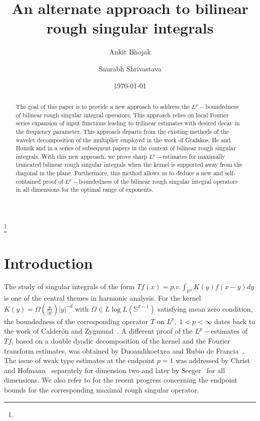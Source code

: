 \documentclass[a4paper,reqno]{amsart}
\date{\today}
\newcommand{\R}{{\mathbb R}}       %
\newcommand{\Sp}{{\mathbb S}}
\theoremstyle{definition}
\numberwithin{equation}{section}
\begin{document}
	
\title{An alternate approach to bilinear rough singular integrals}
\author[Bhojak]{Ankit Bhojak}
	\address{Ankit Bhojak\\
		Department of Mathematics\\
		Indian Institute of Science Education and Research Bhopal\\
		Bhopal-462066, India.}

\author[Shrivastava]{Saurabh Shrivastava}
	\address{Saurabh Shrivastava\\
		Department of Mathematics\\
		Indian Institute of Science Education and Research Bhopal\\
		Bhopal-462066, India.}
\thanks{}
\begin{abstract}
	The goal of this paper is to provide a new approach to address the $L^p-$boundedness of bilinear rough singular integral operators. This approach relies on local Fourier series expansion of input functions leading to trilinear estimates with desired decay in the frequency parameter. This approach departs from the existing methods of the wavelet decomposition of the multiplier employed in the work of Grafakos, He and Honz\'ik and in a series of subsequent papers in the context of bilinear rough singular integrals. With this new approach, we prove sharp $L^p-$estimates for maximally truncated bilinear rough singular integrals when the kernel is supported away from the diagonal in the plane.  Furthermore, this method allows us to deduce a new and self-contained proof of $L^p-$boundedness of the bilinear rough singular integral operators in all dimensions for the optimal range of exponents. 
\end{abstract}
	
	
\maketitle
	
\section{Introduction}
The study of singular integrals of the form $Tf(x)=p.v.\int_{\R^d} K(y)f(x-y)dy$ is one of the central themes in harmonic analysis. For the kernel $K(y)=\Omega(\frac{y}{|y|})|y|^{-d}$ with $\Omega\in L\log L(\Sp^{d-1})$ satisfying mean zero condition, the boundedness of the corresponding operator $T$ on $L^p,\;1<p<\infty$ dates back to the work of Calder\'{o}n and Zygmund~\cite{CZ1956}. A different proof of the $L^p-$estimates of $Tf$, based on a double dyadic decomposition of the kernel and the Fourier transform estimates, was obtained by Duoandikoetxea and Rubio de Francia~\cite{DR1986}. The issue of weak type estimates at the endpoint $p=1$ was addressed by Christ \cite{Christ1988} and Hofmann~\cite{Hofmann1988} separately for dimension two and later by Seeger~\cite{Seeger1996} for all dimensions. We also refer to \cite{Honzik2020,BM2023,Lai2025,BS2026} for the recent progress concerning the endpoint bounds for the corresponding maximal rough singular operator.
\end{document}
